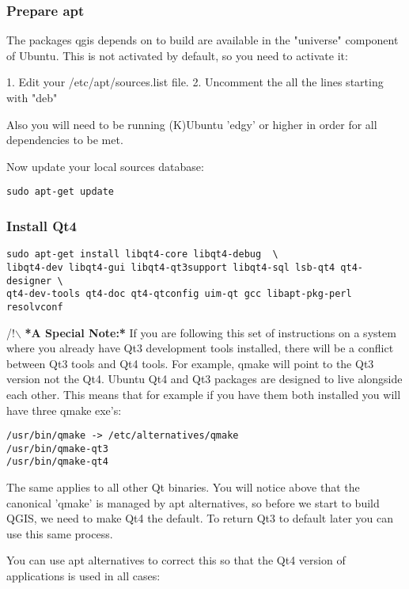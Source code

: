 \subsubsection{Prepare apt}
The packages qgis depends on to build are available in the "universe" component
of Ubuntu. This is not activated by default, so you need to activate it:

1. Edit your /etc/apt/sources.list file.  
2. Uncomment the all the lines starting with "deb"

Also you will need to be running (K)Ubuntu 'edgy' or higher in order for 
all dependencies to be met.

Now update your local sources database:

\begin{verbatim}
sudo apt-get update 
\end{verbatim}

\subsubsection{Install Qt4}
\begin{verbatim}
sudo apt-get install libqt4-core libqt4-debug  \
libqt4-dev libqt4-gui libqt4-qt3support libqt4-sql lsb-qt4 qt4-designer \
qt4-dev-tools qt4-doc qt4-qtconfig uim-qt gcc libapt-pkg-perl resolvconf
\end{verbatim}

/!$\backslash$ \textbf{*A Special Note:*} If you are following this set of instructions on
a system where you already have Qt3 development tools installed, there will
be a conflict between Qt3 tools and Qt4 tools. For example, qmake will
point to the Qt3 version not the Qt4. Ubuntu Qt4 and Qt3 packages are
designed to live alongside each other. This means that for example if you
have them both installed you will have three qmake exe's:

\begin{verbatim}
/usr/bin/qmake -> /etc/alternatives/qmake 
/usr/bin/qmake-qt3
/usr/bin/qmake-qt4 
\end{verbatim}

The same applies to all other Qt binaries. You will notice above that the
canonical 'qmake' is managed by apt alternatives, so before we start to
build QGIS, we need to make Qt4 the default. To return Qt3 to default later
you can use this same process.

You can use apt alternatives to correct this so that the Qt4 version of
applications is used in all cases:

